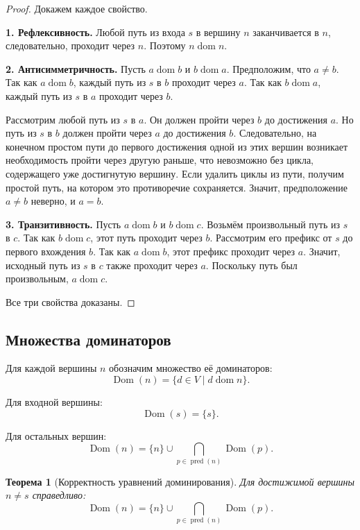 \documentclass[12pt,a4paper]{article}
\newtheorem{theorem}{Теорема}
\DeclareMathOperator{\dom}{dom}
\DeclareMathOperator{\pred}{pred}
\DeclareMathOperator{\Dom}{Dom}
\begin{document}
\begin{proof}
Докажем каждое свойство.

\textbf{1. Рефлексивность.}
Любой путь из входа $s$ в вершину $n$ заканчивается в $n$, следовательно, проходит через $n$. Поэтому $n\dom n$.

\textbf{2. Антисимметричность.}
Пусть $a\dom b$ и $b\dom a$.
Предположим, что $a\neq b$.
Так как $a\dom b$, каждый путь из $s$ в $b$ проходит через $a$.
Так как $b\dom a$, каждый путь из $s$ в $a$ проходит через $b$.

Рассмотрим любой путь из $s$ в $a$. Он должен пройти через $b$ до достижения $a$.
Но путь из $s$ в $b$ должен пройти через $a$ до достижения $b$.
Следовательно, на конечном простом пути до первого достижения одной из этих вершин возникает необходимость пройти через другую раньше, что невозможно без цикла, содержащего уже достигнутую вершину.
Если удалить циклы из пути, получим простой путь, на котором это противоречие сохраняется.
Значит, предположение $a\neq b$ неверно, и $a=b$.

\textbf{3. Транзитивность.}
Пусть $a\dom b$ и $b\dom c$.
Возьмём произвольный путь из $s$ в $c$.
Так как $b\dom c$, этот путь проходит через $b$.
Рассмотрим его префикс от $s$ до первого вхождения $b$.
Так как $a\dom b$, этот префикс проходит через $a$.
Значит, исходный путь из $s$ в $c$ также проходит через $a$.
Поскольку путь был произвольным, $a\dom c$.

Все три свойства доказаны.
\end{proof}

\subsection{Множества доминаторов}

Для каждой вершины $n$ обозначим множество её доминаторов:
\[
\Dom(n)=\{d\in V \mid d\dom n\}.
\]

Для входной вершины:
\[
\Dom(s)=\{s\}.
\]

Для остальных вершин:
\[
\Dom(n)=\{n\}\cup \bigcap_{p\in \pred(n)} \Dom(p).
\]

\begin{theorem}[Корректность уравнений доминирования]
Для достижимой вершины $n\neq s$ справедливо:
\[
\Dom(n)=\{n\}\cup \bigcap_{p\in \pred(n)} \Dom(p).
\]
\end{theorem}
\end{document}

